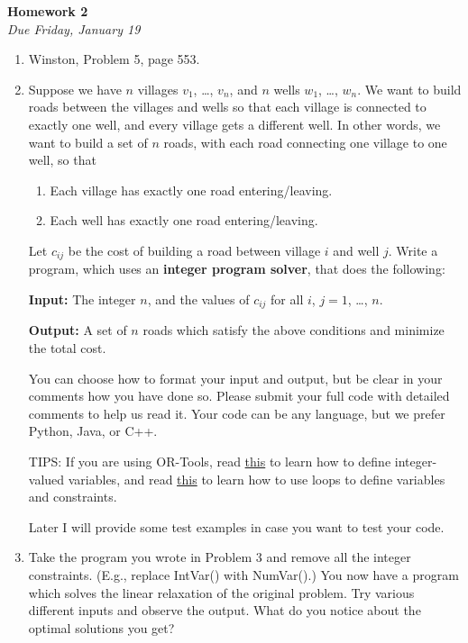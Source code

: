 \documentclass[oneside,12pt]{memoir}
\begin{document}
\begin{center}
\textbf{\large Homework 2} \\
\emph{Due Friday, January 19}
\end{center}

\begin{enumerate}[leftmargin=*]

\item Winston, Problem 5, page 553.
\item Suppose we have $n$ villages $v_1$, \dots, $v_n$, and $n$ wells $w_1$, \dots, $w_n$. We want to build roads between the villages and wells so that each village is connected to exactly one well, and every village gets a different well. In other words, we want to build a set of $n$ roads, with each road connecting one village to one well, so that 
	\begin{enumerate}
		\item Each village has exactly one road entering/leaving.
		\item Each well has exactly one road entering/leaving.
	\end{enumerate}
	Let $c_{ij}$ be the cost of building a road between village $i$ and well $j$. Write a program, which uses an \textbf{integer program solver}, that does the following:
	
	\textbf{Input:} The integer $n$, and the values of $c_{ij}$ for all $i$, $j = 1$, \dots, $n$.
	
	\textbf{Output:} A set of $n$ roads which satisfy the above conditions and minimize the total cost.
	
	You can choose how to format your input and output, but be clear in your comments how you have done so. Please submit your full code with detailed comments to help us read it. Your code can be any language, but we prefer Python, Java, or C++.
	
	TIPS: If you are using OR-Tools, read \href{https://developers.google.com/optimization/mip/mip_example}{this} to learn how to define integer-valued variables, and read \href{https://developers.google.com/optimization/mip/mip_var_array}{this} to learn how to use loops to define variables and constraints.
	
	Later I will provide some test examples in case you want to test your code.
	
\item Take the program you wrote in Problem 3 and remove all the integer constraints. (E.g., replace IntVar() with NumVar().) You now have a program which solves the linear relaxation of the original problem. Try various different inputs and observe the output. What do you notice about the optimal solutions you get?
\end{enumerate}
\end{document}
